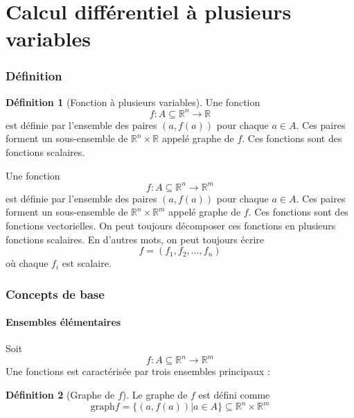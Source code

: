 \documentclass[11pt,a4paper]{article}
\theoremstyle{definition}
\newtheorem{mydef}{Définition}%
\newcommand{\R}{\mathbb{R}}
\begin{document}

\part{Calcul différentiel à plusieurs variables}

\section{Définition}


\begin{mydef}[Fonction à plusieurs variables]
	Une fonction
	\[ f : A \subseteq \R^n \rightarrow \R \]
	est définie par l'ensemble des paires $(a,f(a))$ pour chaque $a \in A$. Ces paires forment un sous-ensemble de $\R^n \times \R$ appelé graphe de $f$. Ces fonctions sont des fonctions scalaires.

	Une fonction
	\[ f : A \subseteq \R^n \rightarrow \R^m \]
	est définie par l'ensemble des paires $(a,f(a))$ pour chaque $a \in A$. Ces paires forment un sous-ensemble de $\R^n \times \R^m$ appelé graphe de $f$. Ces fonctions sont des fonctions vectorielles. On peut toujours décomposer ces fonctions en plusieurs fonctions scalaires. En d'autres mots, on peut toujours écrire
	\[ f = (f_1, f_2, \dots, f_n) \]
	où chaque $f_i$ est scalaire.
\end{mydef}


\section{Concepts de base}

\subsection{Ensembles élémentaires}
Soit
\[ f : A \subseteq \R^n \rightarrow \R^m \]
Une fonctions est caractérisée par trois ensembles principaux :
\begin{mydef} [Graphe de $f$] Le graphe de $f$ est défini comme
	\[ \mathrm{graph} f = \{(a,f(a))| a \in A\} \subseteq \R^n \times \R^m \]
\end{mydef}
\end{document}
